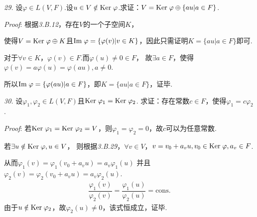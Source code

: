 \hspace*{\fill}

\textit{29.}
设\(\varphi \in L(V,F)\).设\(u \in V \notin \mathrm{Ker \;} \varphi\).求证：\(V=\mathrm{Ker \;} \varphi \oplus \{au|a \in F\}\).

\textit{Proof}:
根据\textit{3.B.12}，存在\(V\)的一个子空间\(K\)，

使得\(V=\mathrm{Ker \;} \varphi \oplus K\)且\(\mathrm{Im \;} \varphi=\{\varphi (v)|v \in K\}\)，因此只需证明\(K=\{au|a \in F\}\)即可.

对于\(\forall v \in K\)，\(\varphi(v) \in F\).而\(\varphi(u) \ne 0 \in F\)，
故\(\exists a \in F\)，使得\(\varphi(v)=a \varphi(u)=\varphi(au),a \ne 0\).

所以\(\mathrm{Im \;} \varphi=\{\varphi (au)|a \in F\}\)，即\(K=\{au|a \in F\}\)，证毕.

\hspace*{\fill}

\textit{30.}
设\(\varphi_1,\varphi_2 \in L(V,F)\)且\(\mathrm{Ker \;}  \varphi_1=\mathrm{Ker \;}  \varphi_2\).
求证：存在常数\(c \in F\)，使得\(\varphi_1=c \varphi_2\).

\textit{Proof}:
若\(\mathrm{Ker \;} \varphi_1=\mathrm{Ker \;} \varphi_2=V\)，则\(\varphi_1=\varphi_2=0\)，故\(c\)可以为任意常数.

若\(\exists u \notin \mathrm{Ker \;} \varphi,u \in V\)，
则根据\textit{3.B.29}，\(\forall v \in V\)，\(v=v_0+a_vu,v_0 \in \mathrm{Ker \;} \varphi,a_v \in F\).

从而\(\varphi_1(v)=\varphi_1(v_0+a_vu)=a_v \varphi_1(u)\)
并且\(\varphi_2(v)=\varphi_2(v_0+a_vu)=a_v \varphi_2(u)\).
    \begin{align*}
        \dfrac{\varphi_1(v)}{\varphi_2(v)}=\dfrac{\varphi_1(u)}{\varphi_2(u)}=\mathrm{cons.}
    \end{align*}
由于\(u \notin \mathrm{Ker \;} \varphi_2\)，故\(\varphi_2(u) \ne 0\)，该式恒成立，证毕.

